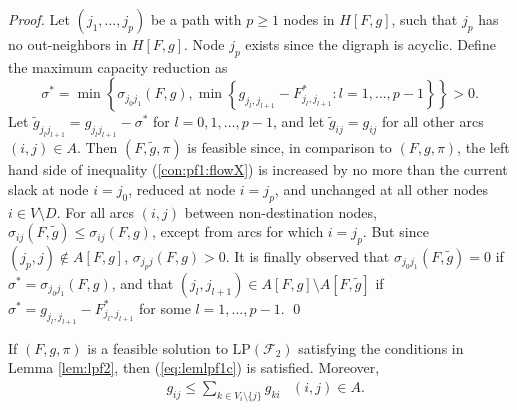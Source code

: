 \begin{proof}
Let $(j_1,\ldots,j_p)$ be a path with $p\geq 1$ nodes in $H[F,g]$, such that $j_p$ has no out-neighbors in $H[F,g]$.
Node $j_p$ exists since the digraph is acyclic.
Define the maximum capacity reduction as
\[ \sigma^*=\min\left\{\sigma_{j_0j_1}(F,g),\min\left\{g_{j_l,j_{l+1}}-F^*_{j_l,j_{l+1}}: l=1,\ldots,p-1\right\}\right\}>0.\]
Let $\tilde{g}_{j_lj_{l+1}}=g_{j_lj_{l+1}}-\sigma^*$ for $l=0,1,\ldots,p-1$, and let $\tilde{g}_{ij}=g_{ij}$ for all other arcs $(i,j)\in A$.
Then $(F,\tilde{g},\pi)$ is feasible since, in comparison to $(F,g,\pi)$,  the left hand side of inequality (\ref{con:pf1:flowX}) is
increased by no more than the current slack at node $i=j_0$, reduced at node $i=j_p$, and unchanged at all other nodes $i\in V\setminus D$.
For all arcs $(i,j)$ between non-destination nodes, $\sigma_{ij}(F,\tilde{g})\leq\sigma_{ij}(F,g)$, except from arcs for which $i=j_p$.
But since $(j_p,j)\not\in A[F,g]$, $\sigma_{j_pj}(F,g)>0$.
It is finally observed that $\sigma_{j_0j_1}(F,\tilde{g})=0$ if $\sigma^*=\sigma_{j_0j_1}(F,g)$,
and that $\left(j_l,j_{l+1}\right)\in A[F,g]\setminus A[F,\tilde{g}]$ if $\sigma^*=g_{j_l,j_{l+1}}-F^*_{j_l,j_{l+1}}$ for some $l=1,\ldots,p-1$.
\qed\end{proof}

\begin{lemma} \label{lem:lpf2gijgji}
If $(F,g,\pi)$ is a feasible solution to $\text{LP}(\mathcal{F}_2)$ satisfying the conditions in Lemma \ref{lem:lpf2}, then (\ref{eq:lemlpf1c}) is satisfied.
Moreover,
\begin{equation}
\begin{aligned}
 & g_{ij} \leq \sum_{k\in V_i\setminus\{j\}}g_{ki} & (i,j)\in A. \label{eq:lemlpf2d}
\end{aligned}
\end{equation}
\end{lemma}

